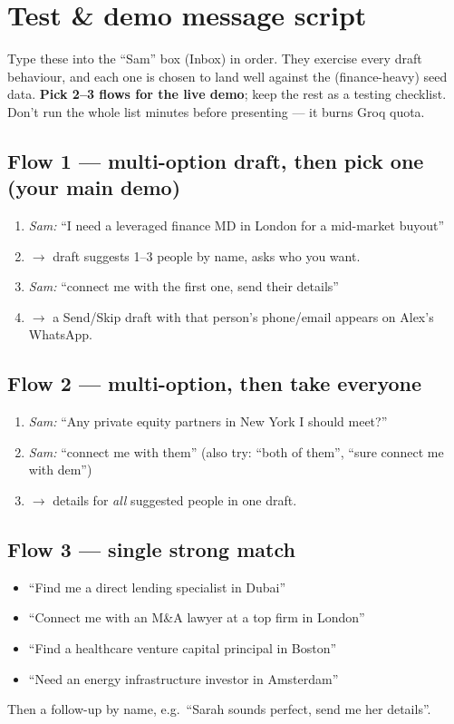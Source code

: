 \documentclass[11pt, a4paper]{article}
\begin{document}
\section{Test \& demo message script}
\label{sec:testscript}

Type these into the ``Sam'' box (Inbox) in order. They exercise every draft behaviour, and each one is chosen to land well against the (finance-heavy) seed data. \textbf{Pick 2--3 flows for the live demo}; keep the rest as a testing checklist. Don't run the whole list minutes before presenting --- it burns Groq quota.

\subsection{Flow 1 --- multi-option draft, then pick one (your main demo)}
\begin{enumerate}
    \item \emph{Sam:} ``I need a leveraged finance MD in London for a mid-market buyout''
    \item[] $\rightarrow$ draft suggests 1--3 people by name, asks who you want.
    \item \emph{Sam:} ``connect me with the first one, send their details''
    \item[] $\rightarrow$ a Send/Skip draft with that person's phone/email appears on Alex's WhatsApp.
\end{enumerate}

\subsection{Flow 2 --- multi-option, then take everyone}
\begin{enumerate}
    \item \emph{Sam:} ``Any private equity partners in New York I should meet?''
    \item \emph{Sam:} ``connect me with them'' \quad(also try: ``both of them'', ``sure connect me with dem'')
    \item[] $\rightarrow$ details for \emph{all} suggested people in one draft.
\end{enumerate}

\subsection{Flow 3 --- single strong match}
\begin{itemize}
    \item ``Find me a direct lending specialist in Dubai''
    \item ``Connect me with an M\&A lawyer at a top firm in London''
    \item ``Find a healthcare venture capital principal in Boston''
    \item ``Need an energy infrastructure investor in Amsterdam''
\end{itemize}
Then a follow-up by name, e.g.\ ``Sarah sounds perfect, send me her details''.
\end{document}
